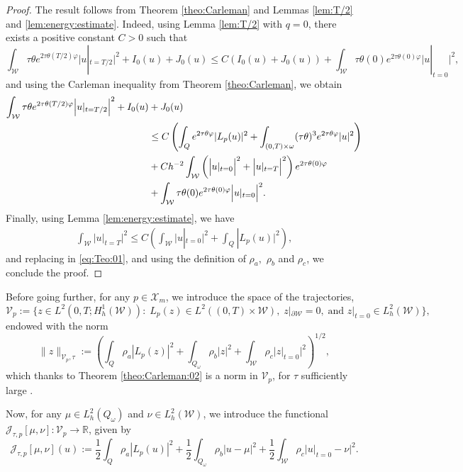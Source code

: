 \documentclass{amsart}
\numberwithin{equation}{section}
\begin{document}
\begin{proof}
    The result follows from Theorem \ref{theo:Carleman} and Lemmas \ref{lem:T/2} and \ref{lem:energy:estimate}. Indeed, using Lemma \ref{lem:T/2} with $q=0$, there exists a positive constant $C>0$ such that 
    \begin{equation*}
        \int_{\mathcal{W}}\tau \theta e^{2\tau\theta(T/2)\varphi}\Big|u|_{t=T/2}\Big|^2+I_{0}(u)+J_{0}(u) \leq C \left( I_{0}(u)+J_{0}(u) \right)+\int_{\mathcal{W}}\tau \theta(0) e^{2\tau\theta(0)\varphi}\Big|u|_{t=0}\Big|^2,
    \end{equation*}
    and using the Carleman inequality from Theorem \ref{theo:Carleman}, we obtain
    \begin{align}\label{eq:Teo:01}
		\int_{\mathcal{W}}\tau \theta e^{2\tau\theta(T/2)\varphi}\Big|u|_{t=T/2}\Big|^2+I_{0}(u)&+J_{0}(u)\notag \\&
		\leq  C\left(\int_Qe^{2\tau\theta\varphi}|L_p(u)|^2+\int_{(0,T)\times\omega}(\tau\theta)^{3}e^{2\tau\theta\varphi}|u|^2\right)\\
		&+Ch^{-2}\int_{\mathcal{W}} \left(\Big|u|_{t=0}\Big|^2+\Big|u|_{t=T}\Big|^2\right)e^{2\tau\theta(0)\varphi}\notag\\
        &+\int_{\mathcal{W}}\tau \theta(0) e^{2\tau\theta(0)\varphi}\Big|u|_{t=0}\Big|^2.\notag
	\end{align}
    Finally, using Lemma \ref{lem:energy:estimate}, we have 
    \begin{align*}
        \int_\mathcal{W} \Big|u|_{t=T}\Big|^2
        \leq C\left(\int_\mathcal{W} \Big|u|_{t=0}\Big|^2+\int_{Q} |L_p(u)|^2\right),
    \end{align*}
    and replacing in \eqref{eq:Teo:01}, and using the definition of $\rho_a,$ $\rho_b$ and $\rho_c$, we conclude the proof.
\end{proof} 
Before going further, for any $p\in\mathcal{X}_{m}$, we introduce the space of the trajectories, 
 $$\mathcal{V}_p:= \{ z\in L^2(0,T;H_h^1(\mathcal{W})):\; L_p(z)\in L^2((0,T)\times\mathcal{W}), \; z|_{\partial\mathcal{W}}=0,\;\textrm{and } z|_{t=0}\in L_{h}^2(\mathcal{W})\},$$
endowed with the norm 
$$\|z\|_{\mathcal{V}_p,\tau}:= \left(\int_Q\rho_a|L_p(z)|^2+\int_{Q_\omega}\rho_b|z|^2 +\int_{\mathcal{W}}\rho_c\Big|z|_{t=0}\Big|^2\right)^{1/2},$$
which thanks to Theorem \ref{theo:Carleman:02} is a norm in $\mathcal{V}_p$, for $\tau$ sufficiently large .

 Now, for any $\mu\in L_{h}^2(Q_\omega)$ and $\nu\in L_{h}^2(\mathcal{W})$, we introduce the functional $\mathcal{J}_{\tau,p}[\mu,\nu]:\mathcal{V}_p\to \mathbb{R}$, given by
\begin{equation}\label{FunctionalJ}
            \mathcal{J}_{\tau,p}[\mu,\nu](u):= \frac{1}{2}\int_Q\rho_a|L_p(u)|^2+\frac{1}{2}\int_{Q_\omega}\rho_b|u-\mu|^2 +\frac{1}{2}\int_{\mathcal{W}}\rho_c\Big|u|_{t=0}-\nu\Big|^2.
\end{equation}
       
\end{document}
